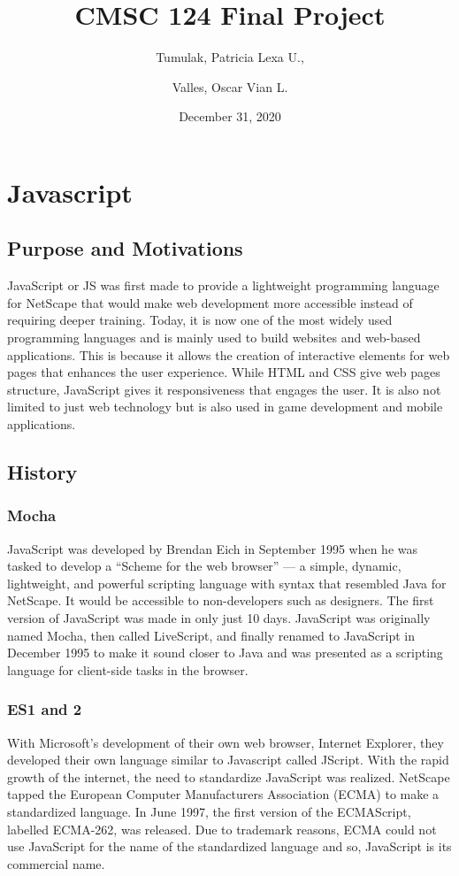 \documentclass{article}
\title{CMSC 124 Final Project}
\date{December 31, 2020}
\author{Tumulak, Patricia Lexa U., \\\and{} Valles, Oscar Vian L.}
\begin{document}
\maketitle
\newpage
\tableofcontents
\newpage
{}

\section{Javascript}
\subsection{Purpose and Motivations}
JavaScript or JS was first made to provide a lightweight programming language
for NetScape that would make web development more accessible instead of
requiring deeper training. Today, it is now one of the most widely used
programming languages and is mainly used to build websites and web-based
applications. This is because it allows the creation of interactive elements for
web pages that enhances the user experience. While HTML and CSS give web pages
structure, JavaScript gives it responsiveness that engages the user. It is also
not limited to just web technology but is also used in game development and
mobile applications.

\subsection{History}

    \subsubsection{Mocha}
    JavaScript was developed by Brendan Eich in September 1995 when he was
    tasked to develop a “Scheme for the web browser” --- a simple, dynamic,
    lightweight, and powerful scripting language with syntax that resembled Java
    for NetScape. It would be accessible to non-developers such as designers.
    The first version of JavaScript was made in only just 10 days. JavaScript
    was originally named Mocha, then called LiveScript, and finally renamed to
    JavaScript in December 1995 to make it sound closer to Java and was
    presented as a scripting language for client-side tasks in the browser.

    \subsubsection{ES1 and 2}
    With Microsoft’s development of their own web browser, Internet Explorer,
    they developed their own language similar to Javascript called JScript. With
    the rapid growth of the internet, the need to standardize JavaScript was
    realized. NetScape tapped the European Computer Manufacturers Association
    (ECMA) to make a standardized language. In June 1997, the first version of
    the ECMAScript, labelled ECMA-262, was released. Due to trademark reasons,
    ECMA could not use JavaScript for the name of the standardized language and
    so, JavaScript is its commercial name.
\end{document}
